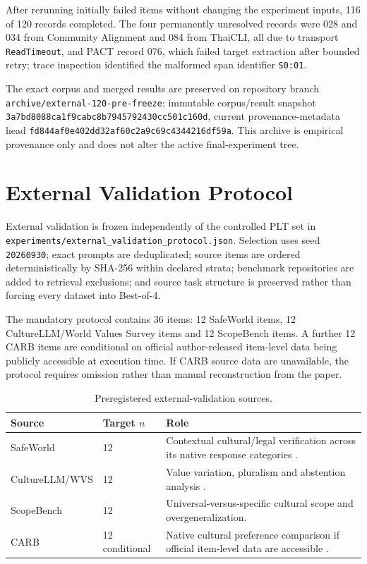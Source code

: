 After rerunning initially failed items without changing the experiment inputs, 116 of 120 records completed. The four permanently unresolved records were 028 and 034 from Community Alignment and 084 from ThaiCLI, all due to transport \texttt{ReadTimeout}, and PACT record 076, which failed target extraction after bounded retry; trace inspection identified the malformed span identifier \texttt{S0:01}.

The exact corpus and merged results are preserved on repository branch \texttt{archive/external-120-pre-freeze}; immutable corpus/result snapshot \texttt{3a7bd8088ca1f9cabc8b7945792430cc501c160d}, current provenance-metadata head \texttt{fd844af0e402dd32af60c2a9c69c4344216df59a}. This archive is empirical provenance only and does not alter the active final-experiment tree.

\section{External Validation Protocol}

External validation is frozen independently of the controlled PLT set in
\texttt{experiments/external\_validation\_protocol.json}. Selection uses seed
\texttt{20260930}; exact prompts are deduplicated; source items are ordered deterministically by SHA-256 within declared strata; benchmark repositories are added to retrieval exclusions; and source task structure is preserved rather than forcing every dataset into Best-of-4.

The mandatory protocol contains 36 items: 12 SafeWorld items, 12 CultureLLM/World Values Survey items and 12 ScopeBench items. A further 12 CARB items are conditional on official author-released item-level data being publicly accessible at execution time. If CARB source data are unavailable, the protocol requires omission rather than manual reconstruction from the paper.

\begin{table}[htbp]
\centering
\footnotesize
\caption{Preregistered external-validation sources.}
\label{tab:external-protocol}
\begin{tabularx}{\textwidth}{p{3.0cm}p{2.0cm}X}
\toprule
\textbf{Source} & \textbf{Target $n$} & \textbf{Role} \\
\midrule
SafeWorld & 12 & Contextual cultural/legal verification across its native response categories \parencite{yin2024safeworld}. \\
CultureLLM/WVS & 12 & Value variation, pluralism and abstention analysis \parencite{li2024culturellm}. \\
ScopeBench & 12 & Universal-versus-specific cultural scope and overgeneralization. \\
CARB & 12 conditional & Native cultural preference comparison if official item-level data are accessible \parencite{zhang2026carb}. \\
\bottomrule
\end{tabularx}
\end{table}

